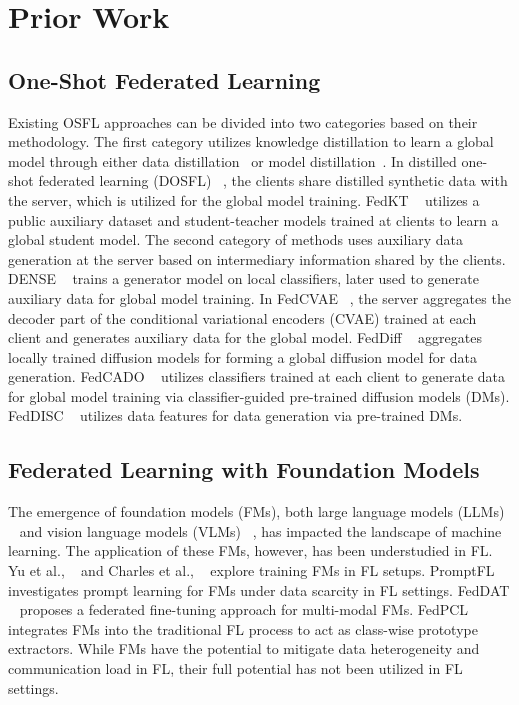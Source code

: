 \section{Prior Work}
\subsection{One-Shot Federated Learning}
Existing OSFL approaches can be divided into two categories based on their methodology. The first category utilizes knowledge distillation to learn a global model through either data distillation~\cite{zhou2020distilled} or model distillation~\cite{li2020practical}. In distilled one-shot federated learning (DOSFL) ~\cite{zhou2020distilled}, the clients share distilled synthetic data with the server, which is utilized for the global model training. FedKT ~\cite{li2020practical} utilizes a public auxiliary dataset and student-teacher models trained at clients to learn a global student model. The second category of methods uses auxiliary data generation at the server based on intermediary information shared by the clients. DENSE ~\cite{zhang2022dense} trains a generator model on local classifiers, later used to generate auxiliary data for global model training. In FedCVAE ~\cite{heinbaugh2023data}, the server aggregates the decoder part of the conditional variational encoders (CVAE) trained at each client and generates auxiliary data for the global model. FedDiff ~\cite{mendieta2024navigating} aggregates locally trained diffusion models for forming a global diffusion model for data generation. FedCADO ~\cite{yang2023one} utilizes classifiers trained at each client to generate data for global model training via classifier-guided pre-trained diffusion models (DMs). FedDISC ~\cite{yang2024exploring} utilizes data features for data generation via pre-trained DMs. 

\subsection{Federated Learning with Foundation Models}

The emergence of foundation models (FMs), both large language models (LLMs) ~\cite{achiam2023gpt} and vision language models (VLMs) ~\cite{li2023blip}, has impacted the landscape of machine learning. The application of these FMs, however, has been understudied in FL. Yu et al., ~\cite{yu2024federated} and Charles et al., ~\cite{charles2024towards} explore training FMs in FL setups. PromptFL ~\cite{guo2023promptfl} investigates prompt learning for FMs under data scarcity in FL settings. FedDAT ~\cite{chen2024feddat} proposes a federated fine-tuning approach for multi-modal FMs. FedPCL ~\cite{tan2022federated} integrates FMs into the traditional FL process to act as class-wise prototype extractors. While FMs have the potential to mitigate data heterogeneity and communication load in FL, their full potential has not been utilized in FL settings.